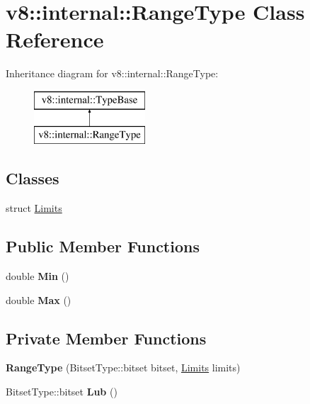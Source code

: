\hypertarget{classv8_1_1internal_1_1_range_type}{}\section{v8\+:\+:internal\+:\+:Range\+Type Class Reference}
\label{classv8_1_1internal_1_1_range_type}
Inheritance diagram for v8\+:\+:internal\+:\+:Range\+Type\+:\begin{figure}[H]
\begin{center}
\leavevmode
\includegraphics[height=2.000000cm]{classv8_1_1internal_1_1_range_type}
\end{center}
\end{figure}
\subsection*{Classes}
\begin{DoxyCompactItemize}
\item 
struct \hyperlink{structv8_1_1internal_1_1_range_type_1_1_limits}{Limits}
\end{DoxyCompactItemize}
\subsection*{Public Member Functions}
\begin{DoxyCompactItemize}
\item 
double {\bfseries Min} ()\hypertarget{classv8_1_1internal_1_1_range_type_ad9f45986176216541724f21f345908ce}{}\label{classv8_1_1internal_1_1_range_type_ad9f45986176216541724f21f345908ce}

\item 
double {\bfseries Max} ()\hypertarget{classv8_1_1internal_1_1_range_type_a955856ed2b44ab555dec8a500bf51647}{}\label{classv8_1_1internal_1_1_range_type_a955856ed2b44ab555dec8a500bf51647}

\end{DoxyCompactItemize}
\subsection*{Private Member Functions}
\begin{DoxyCompactItemize}
\item 
{\bfseries Range\+Type} (Bitset\+Type\+::bitset bitset, \hyperlink{structv8_1_1internal_1_1_range_type_1_1_limits}{Limits} limits)\hypertarget{classv8_1_1internal_1_1_range_type_a591a2df35036e6b7b456d7288f178282}{}\label{classv8_1_1internal_1_1_range_type_a591a2df35036e6b7b456d7288f178282}

\item 
Bitset\+Type\+::bitset {\bfseries Lub} ()\hypertarget{classv8_1_1internal_1_1_range_type_a78d776e7af813d22526b80f6b41eaf97}{}\label{classv8_1_1internal_1_1_range_type_a78d776e7af813d22526b80f6b41eaf97}

\end{DoxyCompactItemize}
